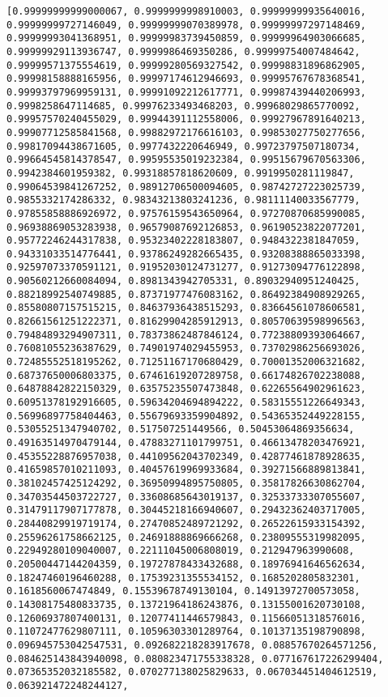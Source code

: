 \documentclass[11pt]{article}
\begin{document}
    \begin{Verbatim}[commandchars=\\\{\}]
[0.99999999999000067, 0.9999999998910003, 0.99999999935640016, 0.99999999727146049, 0.99999999070389978, 0.99999997297148469, 0.99999993041368951, 0.99999983739450859, 0.99999964903066685, 0.99999929113936747, 0.9999986469350286, 0.99999754007484642, 0.99999571375554619, 0.99999280569327542, 0.99998831896862905, 0.99998158888165956, 0.99997174612946693, 0.99995767678368541, 0.99993797969959131, 0.99991092212617771, 0.99987439440206993, 0.9998258647114685, 0.99976233493468203, 0.99968029865770092, 0.99957570240455029, 0.99944391112558006, 0.99927967891640213, 0.99907712585841568, 0.99882972176616103, 0.99853027750277656, 0.99817094438671605, 0.9977432220646949, 0.99723797507180734, 0.99664545814378547, 0.99595535019232384, 0.99515679670563306, 0.9942384601959382, 0.99318857818620609, 0.9919950281119847, 0.99064539841267252, 0.98912706500094605, 0.98742727223025739, 0.9855332174286332, 0.98343213803241236, 0.98111140033567779, 0.97855858886926972, 0.97576159543650964, 0.97270870685990085, 0.96938869053283938, 0.96579087692126853, 0.96190523822077201, 0.95772246244317838, 0.95323402228183807, 0.9484322381847059, 0.94331033514776441, 0.93786249282665435, 0.93208388865033398, 0.92597073370591121, 0.91952030124731277, 0.91273094776122898, 0.90560212660084094, 0.8981343942705331, 0.89032940951240425, 0.88218992540749885, 0.87371977476083162, 0.86492384908929265, 0.85580807157515215, 0.84637936438515293, 0.83664561078606581, 0.82661561251222371, 0.81629904285912913, 0.80570639598996563, 0.79484893294907311, 0.78373862487846124, 0.77238809393064667, 0.76081055236387629, 0.74901974029455953, 0.73702986256693026, 0.72485552518195262, 0.71251167170680429, 0.70001352006321682, 0.68737650006803375, 0.67461619207289758, 0.66174826702238088, 0.64878842822150329, 0.63575235507473848, 0.62265564902961623, 0.60951378192916605, 0.59634204694894222, 0.58315551226649343, 0.56996897758404463, 0.55679693359904892, 0.54365352449228155, 0.53055251347940702, 0.517507251449566, 0.50453064869356634, 0.49163514970479144, 0.47883271101799751, 0.46613478203476921, 0.45355228876957038, 0.44109562043702349, 0.42877461878928635, 0.41659857010211093, 0.40457619969933684, 0.39271566889813841, 0.38102457425124292, 0.36950994895750805, 0.35817826630862704, 0.34703544503722727, 0.33608685643019137, 0.32533733307055607, 0.31479117907177878, 0.30445218166940607, 0.29432362403717005, 0.28440829919719174, 0.27470852489721292, 0.26522615933154392, 0.25596261758662125, 0.24691888869666268, 0.23809555319982095, 0.22949280109040007, 0.22111045006808019, 0.212947963990608, 0.20500447144204359, 0.19727878433432688, 0.18976941646562634, 0.18247460196460288, 0.17539231355534152, 0.1685202805832301, 0.1618560067474849, 0.15539678749130104, 0.14913972700573058, 0.14308175480833735, 0.13721964186243876, 0.13155001620730108, 0.12606937807400131, 0.12077411446579843, 0.11566051318576016, 0.11072477629807111, 0.10596303301289764, 0.10137135198790898, 0.096945753042547531, 0.092682218283917678, 0.08857670264571256, 0.084625143843940098, 0.080823471755338328, 0.077167617226299404, 0.07365352032185582, 0.070277138025829633, 0.067034451404612519, 0.063921472248244127, 
\end{Verbatim}
\end{document}
